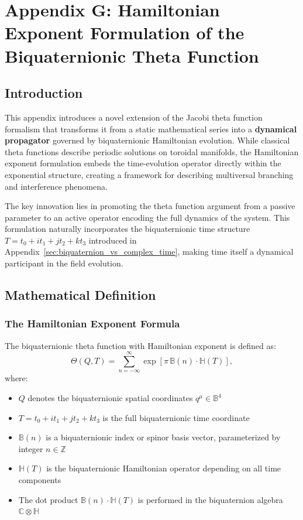 \section{Appendix G: Hamiltonian Exponent Formulation of the Biquaternionic Theta Function}
\label{app:hamiltonian_theta_exponent}

\subsection{Introduction}

This appendix introduces a novel extension of the Jacobi theta function formalism that transforms it from a static mathematical series into a \textbf{dynamical propagator} governed by biquaternionic Hamiltonian evolution. While classical theta functions describe periodic solutions on toroidal manifolds, the Hamiltonian exponent formulation embeds the time-evolution operator directly within the exponential structure, creating a framework for describing multiversal branching and interference phenomena.

The key innovation lies in promoting the theta function argument from a passive parameter to an active operator encoding the full dynamics of the system. This formulation naturally incorporates the biquaternionic time structure $T = t_0 + i t_1 + j t_2 + k t_3$ introduced in Appendix~\ref{sec:biquaternion_vs_complex_time}, making time itself a dynamical participant in the field evolution.

\subsection{Mathematical Definition}

\subsubsection{The Hamiltonian Exponent Formula}

The biquaternionic theta function with Hamiltonian exponent is defined as:
\begin{equation}
\Theta(Q, T) = \sum_{n=-\infty}^{\infty} \exp\!\left[\pi\,\mathbb{B}(n) \cdot \mathbb{H}(T)\right],
\label{eq:theta_hamiltonian_exponent}
\end{equation}
where:
\begin{itemize}
\item $Q$ denotes the biquaternionic spatial coordinates $q^\mu \in \mathbb{B}^4$
\item $T = t_0 + i t_1 + j t_2 + k t_3$ is the full biquaternionic time coordinate
\item $\mathbb{B}(n)$ is a biquaternionic index or spinor basis vector, parameterized by integer $n \in \mathbb{Z}$
\item $\mathbb{H}(T)$ is the biquaternionic Hamiltonian operator depending on all time components
\item The dot product $\mathbb{B}(n) \cdot \mathbb{H}(T)$ is performed in the biquaternion algebra $\mathbb{C} \otimes \mathbb{H}$
\end{itemize}

